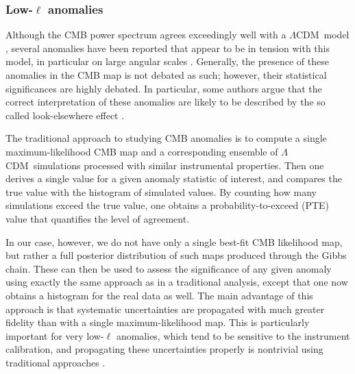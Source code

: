 \documentclass[twocolumn]{../../common/aa}
\def\WMAPnine{\emph{WMAP9}}
\def\planck{\emph{Planck}}
\def\LCDM{$\Lambda$CDM}
\newcommand{\bp}{\textsc{BeyondPlanck}}
\newcommand{\cosmoglobe}{\textsc{Cosmoglobe}}
\begin{document}


\subsubsection{Low-$\ell$ anomalies}
\label{sec:anomalies}

Although the CMB power spectrum agrees exceedingly well with a \LCDM\ model \citep[e.g.,][]{hinshaw2012,planck2016-l06,bp12}, several anomalies have been reported that appear to be in tension with this model, in particular on large angular scales \citep[e.g.,][and references therein]{planck2016-l07}. Generally, the presence of these anomalies in the CMB map is not debated as such; however, their statistical significances are highly debated. In particular, some authors argue that the correct interpretation of these anomalies are likely to be described by the so called look-elsewhere effect \citep[e.g.,][]{bennett2010}. %

The traditional approach to studying CMB anomalies is to compute a single maximum-likelihood CMB map and a corresponding ensemble of \LCDM\ simulations processed with similar instrumental properties. Then one derives a single value for a given anomaly statistic of interest, and compares the true value with the histogram of simulated values. By counting how many simulations exceed the true value, one obtains a probability-to-exceed (PTE) value that quantifies the level of agreement. 

In our case, however, we do not have only a single best-fit CMB likelihood map, but rather a full posterior distribution of such maps produced through the Gibbs chain. These can then be used to assess the significance of any given anomaly using exactly the same approach as in a traditional analysis, except that one now obtains a histogram for the real data as well. The main advantage of this approach is that systematic uncertainties are propagated with much greater fidelity than with a single maximum-likelihood map. This is particularly important for very low-$\ell$ anomalies, which tend to be sensitive to the instrument calibration, and propagating these uncertainties properly is nontrivial using traditional approaches \citep{bp04}. %
\end{document}

